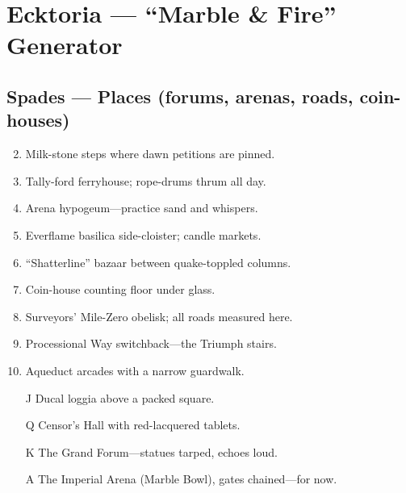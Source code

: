 \chapter{Ecktoria --- ``Marble \& Fire'' Generator}
\label{chap:ecktoria}

\section*{Spades --- Places (forums, arenas, roads, coin-houses)}
\label{sec:ecktoria-places}
\begin{enumerate}
\setcounter{enumi}{1}
\item Milk-stone steps where dawn petitions are pinned.
\item Tally-ford ferryhouse; rope-drums thrum all day.
\item Arena hypogeum---practice sand and whispers.
\item Everflame basilica side-cloister; candle markets.
\item ``Shatterline'' bazaar between quake-toppled columns.
\item Coin-house counting floor under glass.
\item Surveyors' Mile-Zero obelisk; all roads measured here.
\item Processional Way switchback---the Triumph stairs.
\item Aqueduct arcades with a narrow guardwalk.
\item[J] Ducal loggia above a packed square.
\item[Q] Censor's Hall with red-lacquered tablets.
\item[K] The Grand Forum---statues tarped, echoes loud.
\item[A] The Imperial Arena (Marble Bowl), gates chained---for now.
\end{enumerate}

